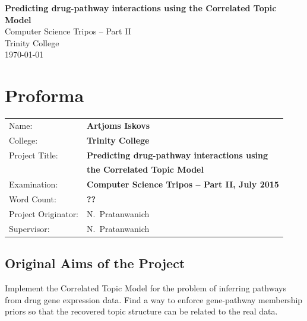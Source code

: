 \documentclass[12pt,a4paper,twoside,openright]{report}
\begin{document}





\pagestyle{empty}


\vspace*{60mm}
\begin{center}
\Huge
\textbf{Predicting drug-pathway interactions using the Correlated Topic Model} \\[5mm]
Computer Science Tripos -- Part II \\[5mm]
Trinity College \\[5mm]
\today  %
\end{center}


\pagestyle{plain}

\chapter*{Proforma}

{\large
\begin{tabular}{ll}
Name:               & \bf Artjoms Iskovs                       \\
College:            & \bf Trinity College                     \\
Project Title:     & \bf Predicting drug-pathway interactions using \\ & \bf the Correlated Topic Model\\
Examination:        & \bf Computer Science Tripos -- Part II, July 2015  \\
Word Count:         & \bf ??\\
Project Originator: & N.~Pratanwanich                    \\
Supervisor:         & N.~Pratanwanich                    \\ 
\end{tabular}
}

\section*{Original Aims of the Project}
Implement the Correlated Topic Model for the problem of inferring pathways from drug gene expression data. Find a way to enforce gene-pathway membership priors so that the recovered topic structure can be related to the real data.
\end{document}
